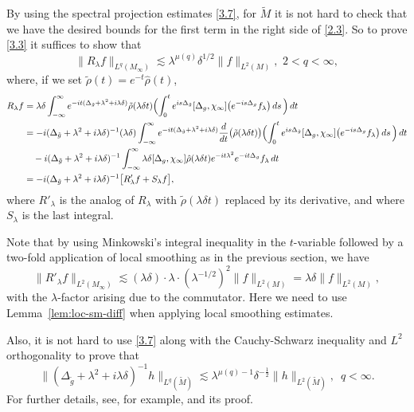 \documentclass[10pt]{amsart}
\newcommand{\la}{\lambda}
\newcommand{\1}{{\bf 1}}
\begin{document}
By using
the spectral projection estimates
 \eqref{3.7}, for $\tilde M$
it is not hard to check that we have the desired bounds for the first term in the right side of \eqref{2.3}.  So to prove \eqref{3.3} it suffices to show that
\begin{equation}\label{3.4.1}
\|R_\la f\|_{L^q(M_\infty)}\lesssim 
    \la^{\mu(q)}\delta^{1/2}\|f\|_{L^2(M)},  \,\,  2<q<\infty,
\end{equation}
where, 
if we set $\tilde \rho(t)=e^{-t} \hat{\rho}(t)$,
\begin{align}\label{3.4.2}
R_\la f&=\la\delta\int_{-\infty}^\infty
e^{-it(\Delta_{\tilde g}+\la^2+i\la\delta )} \tilde \rho(\la\delta t) \Bigl(\int_0^t
e^{is\Delta_{\tilde g}} [\Delta_g,\chi_\infty] \bigl(e^{-is\Delta_g} f_\la \bigr)\, ds\, \Bigr) \, dt
\\
&=-i (\Delta_{\tilde g}+\la^2+i\la \delta )^{-1} (\la\delta)\int_{-\infty}^\infty
e^{-it(\Delta_{\tilde g}+\la^2+i\la\delta )} \frac{d}{dt} \bigl( \tilde \rho(\la\delta t)\bigr) \Bigl(\int_0^t
e^{is\Delta_{\tilde g}} [\Delta_g,\chi_\infty] \bigl(e^{-is\Delta_g} f_\la \bigr)\, ds\, \Bigr) \, dt
\notag
\\
&\quad -i (\Delta_{\tilde g}+\la^2+i\la\delta )^{-1}  \int_{-\infty}^\infty  \la\delta[\Delta_g,\chi_\infty] {\hat{\rho}}(\la\delta t)e^{-it\la^2} e^{-it\Delta_g}f_\la \, dt
\notag
\\
&= -i(\Delta_{\tilde g}+\la^2+i\la\delta )^{-1}  \bigl[ R'_\la f+S_\la f\bigr],
\notag
\end{align}
where $R'_\la$ is the analog of $R_\la$ with $\tilde \rho(\la\delta t)$ replaced by its derivative, and where $S_\la$ is the last integral.


Note that by using Minkowski's integral inequality in the $t$-variable followed by a two-fold application of local smoothing as in the previous section, we have
\begin{equation}\label{3.6}
\|R'_\la f\|_{L^2(M_\infty)}\lesssim (\la\delta)\cdot\la \cdot (\la^{-1/2})^2 \|f\|_{L^2(M)}=\lambda\delta\|f\|_{L^2(M)},
\end{equation}
with the $\la$-factor arising due to the commutator. 
 Here we need to use Lemma~\ref{lem:loc-sm-diff} when applying local smoothing estimates.

Also, it is not hard to use \eqref{3.7} along with the Cauchy-Schwarz inequality and $L^2$ orthogonality to prove that
\begin{equation}\label{3.8}
\| (\Delta_{\tilde g}+\la^2+i\la\delta )^{-1} h\|_{L^q(\tilde M)} \lesssim \la^{\mu(q)-1}\delta^{-\frac12}\|h\|_{L^2(\tilde M)},\,\,\, q<\infty.
\end{equation}
For further details, see, for example, \cite[Proposition 1.3]{SZqm} and its proof.
\end{document}
